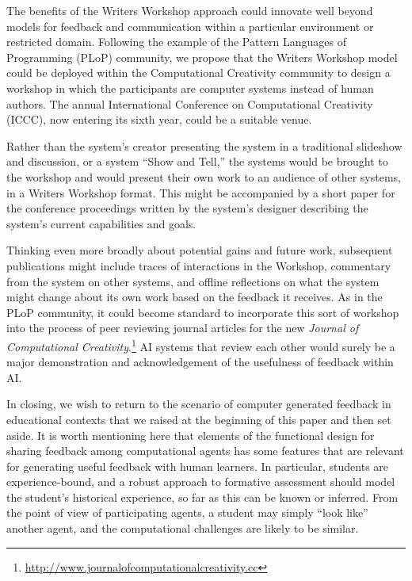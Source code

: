
The benefits of the Writers Workshop approach could innovate well beyond models for 
feedback and communication within a particular environment or restricted domain. 
Following the example of the Pattern Languages of Programming (PLoP) community, we propose that the Writers Workshop model could be deployed
within the Computational Creativity community to design a workshop in
which the participants are computer systems instead of human authors.
The annual International Conference on Computational Creativity
(ICCC), now entering its sixth year, could be a suitable venue. 

Rather than the system's creator presenting the system in a
traditional slideshow and discussion, or a system ``Show and Tell,''
the systems would be brought to the workshop and would present their
own work to an audience of other systems, in a Writers Workshop
format.  This might be accompanied by a short paper for the conference
proceedings written by the system's designer describing the system's
current capabilities and goals.  

Thinking even more broadly about potential gains and future work, subsequent publications might include
traces of interactions in the Workshop, commentary from the system on
other systems, and offline reflections on what the system might change
about its own work based on the feedback it receives.  As in the PLoP
community, it could become standard to incorporate this sort of workshop
into the process of peer reviewing journal articles for the new \emph{Journal of
  Computational Creativity}.\footnote{\url{http://www.journalofcomputationalcreativity.cc}} AI systems that review each other would surely be a major demonstration and acknowledgement of the usefulness of feedback within AI.

In closing, we wish to return to the scenario of computer generated
feedback in educational contexts that we raised at the beginning of
this paper and then set aside.  It is worth mentioning here that
elements of the functional design for sharing feedback among
computational agents has some features that are relevant for
generating useful feedback with human learners.  In particular,
students are experience-bound, and a robust approach to formative
assessment should model the student's historical experience, so far as
this can be known or inferred.  From the point of view of
participating agents, a student may simply ``look like'' another
agent, and the computational challenges are likely to be similar.
